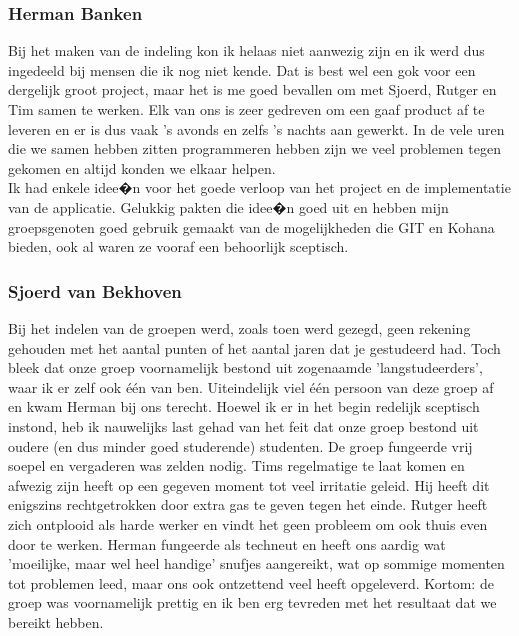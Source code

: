 \documentclass[a4paper,10pt]{article}
\begin{document}
		\subsubsection{Herman Banken}
		Bij het maken van de indeling kon ik helaas niet aanwezig zijn en ik werd dus ingedeeld bij mensen die ik nog niet kende. Dat is best wel een gok voor een dergelijk groot project, maar het is me goed bevallen om met Sjoerd, Rutger en Tim samen te werken. Elk van ons is zeer gedreven om een gaaf product af te leveren en er is dus vaak 's avonds en zelfs 's nachts aan gewerkt. In de vele uren die we samen hebben zitten programmeren hebben zijn we veel problemen tegen gekomen en altijd konden we elkaar helpen.\\
		Ik had enkele idee�n voor het goede verloop van het project en de implementatie van de applicatie. Gelukkig pakten die idee�n goed uit en hebben mijn groepsgenoten goed gebruik gemaakt van de mogelijkheden die GIT en Kohana bieden, ook al waren ze vooraf een behoorlijk sceptisch.
		
		\subsubsection{Sjoerd van Bekhoven}
		Bij het indelen van de groepen werd, zoals toen werd gezegd, geen rekening gehouden met het aantal punten of het aantal jaren dat je gestudeerd had. Toch bleek dat onze groep voornamelijk bestond uit zogenaamde 'langstudeerders', waar ik er zelf ook \'e\'en van ben. Uiteindelijk viel \'e\'en persoon van deze groep af en kwam Herman bij ons terecht. Hoewel ik er in het begin redelijk sceptisch instond, heb ik nauwelijks last gehad van het feit dat onze groep bestond uit oudere (en dus minder goed studerende) studenten. De groep fungeerde vrij soepel en vergaderen was zelden nodig. Tims regelmatige te laat komen en afwezig zijn heeft op een gegeven moment tot veel irritatie geleid. Hij heeft dit enigszins rechtgetrokken door extra gas te geven tegen het einde. Rutger heeft zich ontplooid als harde werker en vindt het geen probleem om ook thuis even door te werken. Herman fungeerde als techneut en heeft ons aardig wat 'moeilijke, maar wel heel handige' snufjes aangereikt, wat op sommige momenten tot problemen leed, maar ons ook ontzettend veel heeft opgeleverd. Kortom: de groep was voornamelijk prettig en ik ben erg tevreden met het resultaat dat we bereikt hebben.
		
\end{document}
